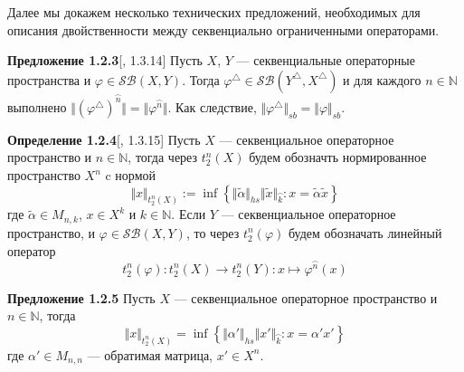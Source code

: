 \documentclass[12pt]{article}
\begin{document}
\medskip

Далее мы докажем несколько технических предложений, необходимых для описания
двойственности между секвенциально ограниченными операторами.

\medskip

{\bf Предложение 1.2.3}[\cite{LamOpFolgen}, 1.3.14]\label{PrDualSBOp} Пусть $X$,
$Y$ --- секвенциальные операторные пространства и $\varphi\in
\mathcal{SB}(X,Y)$. Тогда $\varphi^\triangle \in\mathcal{SB}(Y^\triangle
,X^\triangle )$ и для каждого  $n\in\mathbb{N}$ выполнено
$\Vert{(\varphi^\triangle)}^{\wideparen{n}}\Vert
=\Vert\varphi^{\wideparen{n}}\Vert$. Как следствие,
$\Vert\varphi^\triangle \Vert_{sb}=\Vert\varphi\Vert_{sb}$.

\medskip

{\bf Определение 1.2.4}[\cite{LamOpFolgen}, 1.3.15]\label{DefT2n} Пусть $X$ ---
секвенциальное операторное пространство и $n\in\mathbb{N}$, тогда через
$t_2^n(X)$ будем обозначть нормированное пространство $X^n$ c нормой
$$
\Vert x\Vert_{t_2^n(X)}
:=\inf\left \{
    \Vert\tilde{\alpha}\Vert_{hs}
    \Vert \tilde{x}\Vert_{\wideparen{k}}:x=\tilde{\alpha} \tilde{x}
\right \}
$$
где $\tilde{\alpha}\in M_{n,k}$, $x\in X^k$ и $k\in\mathbb{N}$. Если $Y$ ---
секвенциальное операторное пространство, и $\varphi\in\mathcal{SB}(X,Y)$, то
через $t_2^n(\varphi)$ будем обозначать линейный оператор
$$
t_2^n(\varphi): t_2^n(X)\to t_2^n(Y): x\mapsto \varphi^{\wideparen{n}}(x)
$$

\medskip

{\bf Предложение 1.2.5}\label{PrT2nNormProperty} Пусть $X$ --- секвенциальное
операторное пространство и $n\in\mathbb{N}$, тогда
$$
\Vert x\Vert_{t_2^n(X)}=\inf\left \{
    \Vert\alpha'\Vert_{hs}\Vert x'\Vert_{\wideparen{k}}:x=\alpha'x'
\right \}
$$
где $\alpha'\in M_{n,n}$ --- обратимая матрица, $x'\in X^{n}$.
\end{document}
